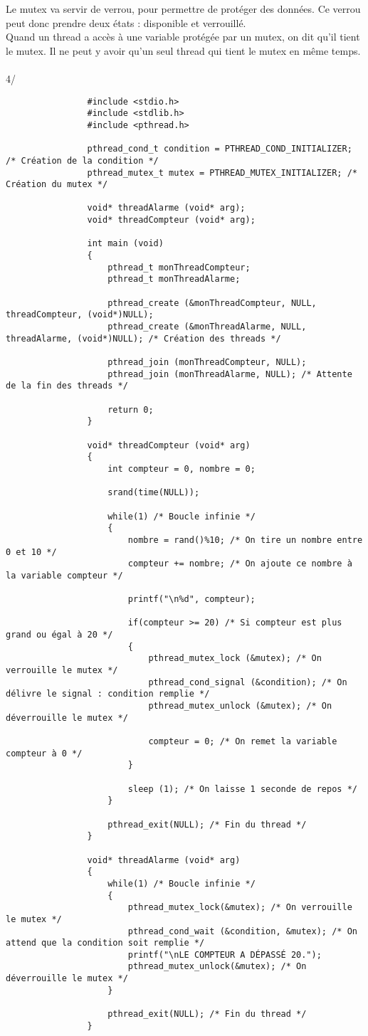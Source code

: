 \documentclass[a4paper,11pt]{article}
\begin{document}
		Le mutex va servir de verrou, pour permettre de protéger des données. Ce verrou peut donc prendre deux états : disponible et verrouillé.\\
		Quand un thread a accès à une variable protégée par un mutex, on dit qu'il tient le mutex. Il ne peut y avoir qu'un seul thread qui tient le mutex en même temps.
		\\~\\
		4/ 
		\begin{lstlisting}
				#include <stdio.h>
				#include <stdlib.h>
				#include <pthread.h>

				pthread_cond_t condition = PTHREAD_COND_INITIALIZER; /* Création de la condition */
				pthread_mutex_t mutex = PTHREAD_MUTEX_INITIALIZER; /* Création du mutex */

				void* threadAlarme (void* arg);
				void* threadCompteur (void* arg);

				int main (void)
				{
					pthread_t monThreadCompteur;
					pthread_t monThreadAlarme;

					pthread_create (&monThreadCompteur, NULL, threadCompteur, (void*)NULL);
					pthread_create (&monThreadAlarme, NULL, threadAlarme, (void*)NULL); /* Création des threads */

					pthread_join (monThreadCompteur, NULL);
					pthread_join (monThreadAlarme, NULL); /* Attente de la fin des threads */

					return 0;
				}

				void* threadCompteur (void* arg)
				{
					int compteur = 0, nombre = 0;
					
					srand(time(NULL));

					while(1) /* Boucle infinie */
					{
						nombre = rand()%10; /* On tire un nombre entre 0 et 10 */
						compteur += nombre; /* On ajoute ce nombre à la variable compteur */

						printf("\n%d", compteur);
						
						if(compteur >= 20) /* Si compteur est plus grand ou égal à 20 */
						{
							pthread_mutex_lock (&mutex); /* On verrouille le mutex */
							pthread_cond_signal (&condition); /* On délivre le signal : condition remplie */
							pthread_mutex_unlock (&mutex); /* On déverrouille le mutex */

							compteur = 0; /* On remet la variable compteur à 0 */
						}

						sleep (1); /* On laisse 1 seconde de repos */
					}
					
					pthread_exit(NULL); /* Fin du thread */
				}

				void* threadAlarme (void* arg)
				{
					while(1) /* Boucle infinie */
					{
						pthread_mutex_lock(&mutex); /* On verrouille le mutex */
						pthread_cond_wait (&condition, &mutex); /* On attend que la condition soit remplie */
						printf("\nLE COMPTEUR A DÉPASSÉ 20."); 
						pthread_mutex_unlock(&mutex); /* On déverrouille le mutex */
					}
					
					pthread_exit(NULL); /* Fin du thread */
				}

			\end{lstlisting}
	
\end{document}
